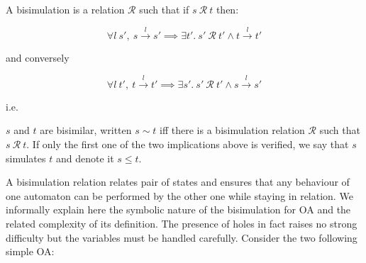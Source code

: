 \documentclass[runningheads]{llncs}
\begin{document}
\begin{definition}
  A bisimulation is a relation $\mathcal{R}$ such that if $s~\mathcal{R}~t$ then:\\
  \begin{minipage}[c]{.6\textwidth}
    \[
      \forall l~s',~ {s}\xrightarrow{l}{s'}
      \implies
      \exists t'.~ s' ~\mathcal{R}~ t'
      \land {t}\xrightarrow{l}{t'}
    \]
\begin{center}    \vspace{-1.5ex}
      and conversely
    \end{center}
    \vspace{-1ex}
    \[
      \forall l~t',~ {t}\xrightarrow{l}{t'}
      \implies
      \exists s'.~ s' ~\mathcal{R}~ t'
      \land {s}\xrightarrow{l}{s'}
    \]
    \vspace{.5ex}
  \end{minipage}
  i.e. \qquad
  \begin{minipage}[c]{.35\textwidth}
  \end{minipage}
$s$ and $t$ are bisimilar, written $s\sim t$ iff there is a bisimulation relation $\mathcal{R}$ such that  $s ~\mathcal{R}~ t$.
If only the first one of the two implications above is verified, we say that $s$ simulates $t$ and denote it $s\leq t$.
\end{definition}

A  bisimulation relation  relates pair of states and ensures that any behaviour of one automaton can be performed by the other one while staying in relation. We informally explain here the symbolic nature of the bisimulation for OA and the related complexity of its definition.
 The presence of holes in fact raises no strong difficulty but the variables must be handled carefully.
Consider the two following simple OA:
\end{document}
